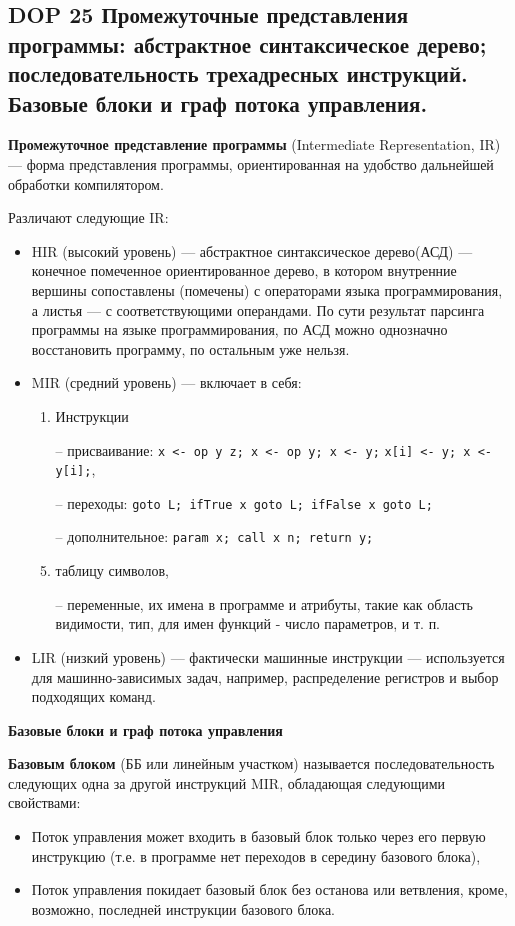 \subsection*{DOP 25 Промежуточные  представления  программы:  абстрактное  синтаксическое  дерево;  последовательность трехадресных инструкций. Базовые блоки и граф потока управления.}

\textbf{Промежуточное представление программы} (Intermediate Representation, IR) --- форма представления программы, ориентированная на удобство дальнейшей обработки компилятором.

Различают следующие IR:
\begin{itemize}
    \item HIR (высокий уровень) --- абстрактное синтаксическое дерево(АСД) --- конечное помеченное ориентированное дерево, в котором внутренние вершины сопоставлены (помечены) с операторами языка программирования, а листья --- с соответствующими операндами. По сути результат парсинга программы на языке программирования, по АСД можно однозначно восстановить программу, по остальным уже нельзя.
    \item MIR (средний уровень) --- включает в себя:
    \begin{enumerate}
        \item Инструкции
        \item[--] присваивание: \texttt{x <- op y z; x <- op y; x <- y;}
        \texttt{x[i] <- y; x <- y[i];},
        \item[--] переходы: \texttt{goto L; ifTrue x goto L; ifFalse x goto L;}
        \item[--] дополнительное: \texttt{param x; call x n; return y;}
        \item таблицу символов,
        \item[--] переменные, их имена в программе и атрибуты, такие как область видимости, тип, для имен функций - число параметров, и т. п.
    \end{enumerate}
    \item LIR (низкий уровень) --- фактически машинные инструкции --- используется для машинно-зависимых задач, например, распределение регистров и выбор подходящих команд.
\end{itemize}

\textbf{Базовые блоки и граф потока управления}

\textbf{Базовым блоком} (ББ или линейным участком) называется последовательность следующих одна за другой инструкций MIR, обладающая следующими свойствами:
\begin{itemize}
    \item Поток управления может входить в базовый блок только через его первую инструкцию (т.е. в программе нет переходов в середину базового блока),
    \item Поток управления покидает базовый блок без останова или ветвления, кроме, возможно, последней инструкции базового блока.
\end{itemize}

